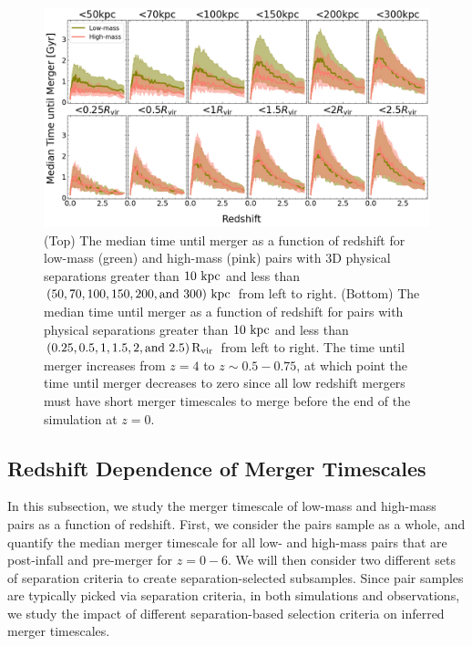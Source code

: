 \documentclass[twocolumn,linenumbers]{aastex631}
\newcommand{\Rvir}{\ensuremath{\rm R_{vir}}}
\begin{document}
\begin{figure}[htb]
    \centering
    \includegraphics[width=\textwidth]{plots/bet-on-it/3_time_til_merger.png}
    \caption{(Top) The median time until merger as a function of redshift for low-mass (green) and high-mass (pink) pairs with 3D physical separations greater than $10\,\mathrm{\,kpc}$ and less than $(50,70,100,150,200,\mbox{and }300)\,\mathrm{\,kpc}$ from left to right. 
    (Bottom) The median time until merger as a function of redshift for pairs with physical separations greater than $10\,\mathrm{\,kpc}$ and less than $(0.25, 0.5, 1, 1.5, 2,\mbox{and }2.5)\,\Rvir$ from left to right. 
    The time until merger increases from $z=4$ to $z\sim0.5-0.75$, at which point the time until merger decreases to zero since all low redshift mergers must have short merger timescales to merge before the end of the simulation at $z=0$. 
    }
    \label{fig:timescales-sep}
\end{figure} 
\subsection{Redshift Dependence of Merger Timescales}\label{sec:results-timevredshift}
In this subsection, we study the merger timescale of low-mass and high-mass pairs as a function of redshift. 
First, we consider the pairs sample as a whole, and quantify the median merger timescale for all low- and high-mass pairs that are post-infall and pre-merger for $z=0-6$. 
We will then consider two different sets of separation criteria to create separation-selected subsamples.
Since pair samples are typically picked via separation criteria, in both simulations and observations, we study the impact of different separation-based selection criteria on inferred merger timescales.
\end{document}

